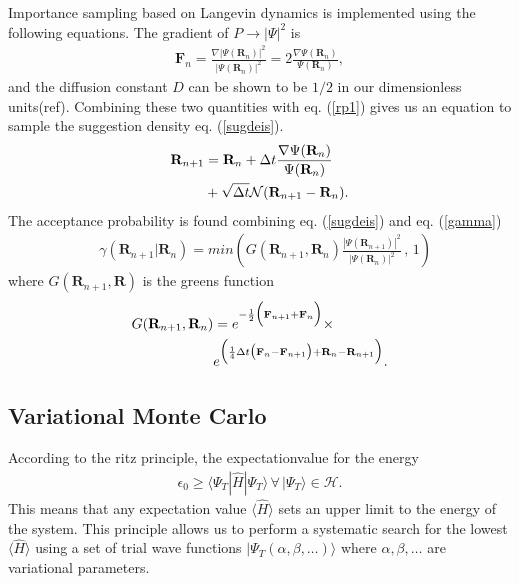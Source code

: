 \documentclass[a4paper,10pt,twocolumn]{article} %
\newcommand{\ts}[1]{\textbf{#1}}
\newcommand{\bra}[1]{\langle{#1}|}
\newcommand{\ket}[1]{|#1\rangle{}}
\newcommand{\abs}[1]{\left|{#1}\right|}
\newcommand{\expec}[1]{\langle{}{#1}\rangle{}}
\begin{document}
Importance sampling based on Langevin dynamics is implemented using the following equations.
The gradient of $P\to\abs{\Psi}^2$ is
\begin{align}
	\ts F_n=\frac{\nabla|\Psi(\ts R_n)|^2}{|\Psi(\ts R_n)|^2} = 2 \frac{\nabla \Psi(\ts R_n)}{\Psi(\ts R_n)},
\end{align}
and the diffusion constant $D$ can be shown to be $1/2$ in our dimensionless units(ref). Combining these two quantities with eq. (\ref{rp1}) gives 
us an equation to sample the suggestion density eq. (\ref{sugdeis}). 
%
\begin{align}
	\ts R_{n+1}&=\ts R_n+\Delta t \frac{\nabla \Psi(\ts R_{n})}{\Psi (\ts R_n)}\notag\\& + \sqrt{\Delta t}\mathcal N(\ts R_{n+1}-\ts R_{n}).
\end{align}
The acceptance probability is found combining eq. (\ref{sugdeis}) and eq. (\ref{gamma}) 
\begin{align} 
	&\gamma(\ts R_{n+1}|\ts R_n)=
	min\left(
	G(\ts R_{n+1},\ts R_n)\frac
	{|\Psi(\ts R_{n+1})|^2}
    {|\Psi(\ts R_{n})|^2}\, 
	,\, 1 \right)
\end{align}
where $G(\ts R_{n+1},\ts R)$ is the greens function
\begin{align}
	G(\ts R_{n+1},\ts R_n)& =%
	 e^{
		-\frac12 
		\Big(\ts F_{n+1}+\ts F_n\Big) }\times\notag\\
	&e^{ 
		\Big(\frac14\Delta t \big(\ts F_{n}-\ts F_{n+1}\big) 
		+ \ts R_{n}-\ts R_{n+1}\Big)}.
\end{align}


\subsection{Variational Monte Carlo}%

According to the ritz principle, the expectationvalue for the energy 
\begin{align}
	\epsilon_0\ge\bra{\Psi_T} \hat H \ket{\Psi_T}\,\forall\,\ket{\Psi_T}\in\mathcal H.
\end{align} 
%
This means that any expectation value $\expec{\hat H}$ sets an upper limit to the energy of the system. 
%
This principle allows us to perform a systematic search for the lowest $\expec{\hat H}$ using a set of trial wave functions 
$\ket{\Psi_T(\alpha,\beta,\dots)}$ where $\alpha,\beta,\dots$ are variational parameters. %
\end{document}
